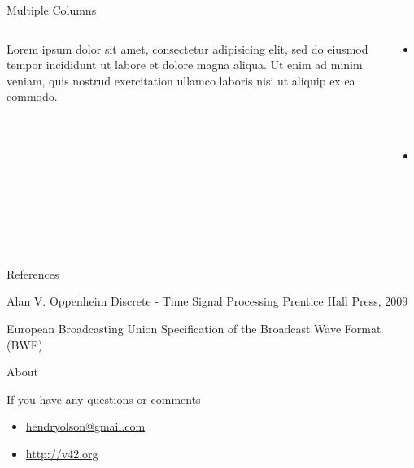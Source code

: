 \documentclass[newPxFont]{beamer}
\begin{document}

\begin{frame}{Multiple Columns}
\begin{columns}
\begin{column}{.48\linewidth}
    Lorem ipsum dolor sit amet, consectetur adipisicing elit, sed do eiusmod
    tempor incididunt ut labore et dolore magna aliqua. Ut enim ad minim veniam,
    quis nostrud exercitation ullamco laboris nisi ut aliquip ex ea commodo.
\end{column}
\begin{column}{.48\linewidth}
    \begin{itemize}
          \item Point 1
          \item Point 2
    \end{itemize}
  \end{column}
  \end{columns}
\end{frame}

\begin{frame}{References}
  \begin{thebibliography}{10}

  \beamertemplatebookbibitems
  Alan V. Oppenheim
  \newblock Discrete - Time Signal Processing
  \newblock Prentice Hall Press, 2009

  \beamertemplatearticlebibitems
  European Broadcasting Union
  \newblock Specification of the Broadcast Wave Format (BWF)

  \end{thebibliography}
\end{frame}

%
%

\begin{frame}{About}

If you have any questions or comments
\begin{itemize}
  \item \url{hendryolson@gmail.com}
    \item \url{http://v42.org}
\end{itemize}
\end{frame}
\end{document}
